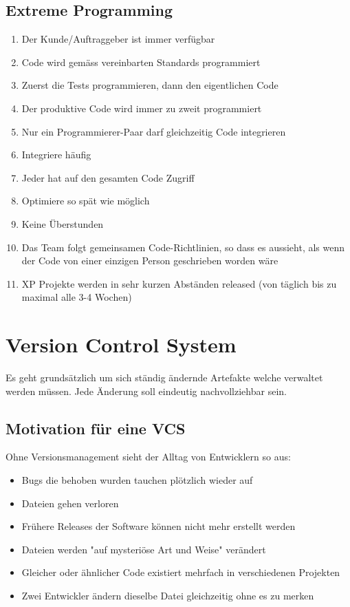 \documentclass[10pt]{article}
\begin{document}
\subsection{Extreme Programming}
\begin{enumerate}
	\item Der Kunde/Auftraggeber ist immer verfügbar
	\item Code wird gemäss vereinbarten Standards programmiert
	\item Zuerst die Tests programmieren, dann den eigentlichen Code
	\item Der produktive Code wird immer zu zweit programmiert
	\item Nur ein Programmierer-Paar darf gleichzeitig Code integrieren
	\item Integriere häufig
	\item Jeder hat auf den gesamten Code Zugriff
	\item Optimiere so spät wie möglich
	\item Keine Überstunden
	\item Das Team folgt gemeinsamen Code-Richtlinien, so dass es aussieht, als wenn der Code von einer einzigen Person geschrieben worden wäre
	\item XP Projekte werden in sehr kurzen Abständen released (von täglich bis zu maximal alle 3-4 Wochen)
\end{enumerate}

\section{Version Control System}
Es geht grundsätzlich um sich ständig ändernde Artefakte welche verwaltet werden müssen. Jede Änderung soll eindeutig nachvollziehbar sein.

\subsection{Motivation für eine VCS}
Ohne Versionsmanagement sieht der Alltag von Entwicklern so aus:
\begin{itemize}
	\item Bugs die behoben wurden tauchen plötzlich wieder auf
	\item Dateien gehen verloren
	\item Frühere Releases der Software können nicht mehr erstellt werden
	\item Dateien werden "auf mysteriöse Art und Weise" verändert
	\item Gleicher oder ähnlicher Code existiert mehrfach in verschiedenen Projekten
	\item Zwei Entwickler ändern dieselbe Datei gleichzeitig ohne es zu merken
\end{itemize}
\end{document}
